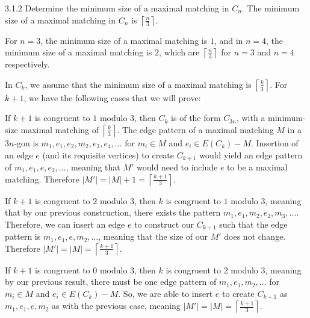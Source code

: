 \documentclass[10pt]{extarticle}
\begin{document}
  \begin{problem}{3.1.2}
    Determine the minimum size of a maximal matching in $C_n$.
    \tcblower
    The minimum size of a maximal matching in $C_n$ is $\left\lceil \frac{n}{3}\right\rceil$.\\
    \begin{description}[font=\normalfont\scshape]
      \item[Base Case] For $n = 3$, the minimum size of a maximal matching is $1$, and in $n =4$, the minimum size of a maximal matching is $2$, which are $\left\lceil \frac{n}{3}\right\rceil$ for $n = 3$ and $n=4$ respectively.
      \item[Inductive Step] In $C_k$, we assume that the minimum size of a maximal matching is $\left\lceil \frac{k}{3} \right\rceil$. For $k+1$, we have the following cases that we will prove:
        \begin{description}[font=\normalfont]
          \item[$k+1 \equiv 1$ mod $3$:] If $k+1$ is congruent to $1$ modulo $3$, then $C_k$ is of the form $C_{3n}$, with a minimum-size maximal matching of $\left\lceil \frac{k}{3}\right\rceil$. The edge pattern of a maximal matching $M$ in a $3n$-gon is $m_1, e_1, e_2, m_2,e_3,e_4,\dots$ for $m_i\in M$ and $e_i \in E(C_k) - M$. Insertion of an edge $e$ (and its requisite vertices) to create $C_{k+1}$ would yield an edge pattern of $m_1,e_1,e,e_2,\dots$, meaning that $M'$ would need to include $e$ to be a maximal matching. Therefore $|M'| = |M| + 1 = \left\lceil \frac{k+1}{3} \right\rceil$.
          \item[$k+1\equiv 2$ mod $3$:] If $k+1$ is congruent to $2$ modulo $3$, then $k$ is congruent to $1$ modulo $3$, meaning that by our previous construction, there exists the pattern $m_1,e_1,m_2,e_2,m_3,\dots$. Therefore, we can insert an edge $e$ to construct our $C_{k+1}$ such that the edge pattern is $m_1,e_1,e,m_2,\dots$, meaning that the size of our $M'$ does not change. Therefore $|M'| = |M| = \left\lceil \frac{k+1}{3}\right\rceil$.
          \item[$k+1\equiv 0$ mod 3:] If $k+1$ is congruent to $0$ modulo $3$, then $k$ is congruent to $2$ modulo $3$, meaning by our previous result, there must be one edge pattern of $m_1,e_1,m_2,\dots$ for $m_i\in M$ and $e_i\in E(C_k) - M$. So, we are able to insert $e$ to create $C_{k+1}$ as $m_1,e_1,e,m_2$ as with the previous case, meaning $|M'| = |M| = \left\lceil \frac{k+1}{3}\right\rceil$.
        \end{description}
    \end{description}
  \end{problem}
\end{document}
